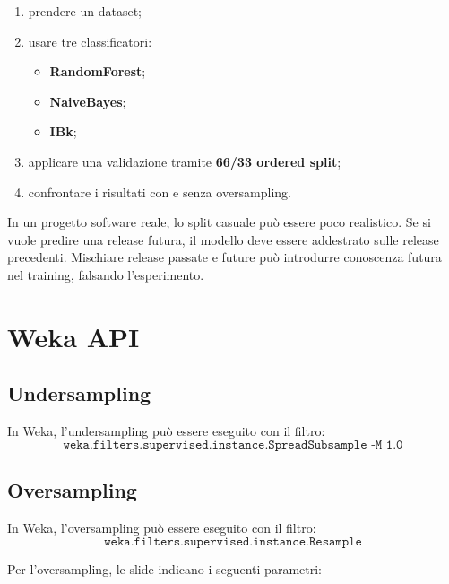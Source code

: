 \begin{enumerate}
    \item prendere un dataset;
    \item usare tre classificatori:
    \begin{itemize}
        \item \textbf{RandomForest};
        \item \textbf{NaiveBayes};
        \item \textbf{IBk};
    \end{itemize}
    \item applicare una validazione tramite \textbf{66/33 ordered split};
    \item confrontare i risultati con e senza oversampling.
\end{enumerate}

\begin{notaprof}
In un progetto software reale, lo split casuale può essere poco realistico. Se si vuole predire una release futura, il modello deve essere addestrato sulle release precedenti. Mischiare release passate e future può introdurre conoscenza futura nel training, falsando l'esperimento.
\end{notaprof}

\section{Weka API}

\subsection{Undersampling}

\begin{notaslide}
In Weka, l'undersampling può essere eseguito con il filtro:
\[
\texttt{weka.filters.supervised.instance.SpreadSubsample -M 1.0}
\]
\end{notaslide}

\subsection{Oversampling}

\begin{notaslide}
In Weka, l'oversampling può essere eseguito con il filtro:
\[
\texttt{weka.filters.supervised.instance.Resample}
\]
\end{notaslide}

Per l'oversampling, le slide indicano i seguenti parametri:

